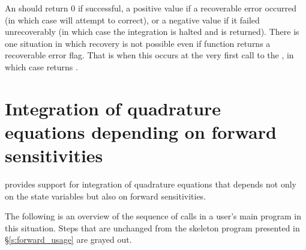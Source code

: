 {
  An  should return 0 if successful, a positive value if a recoverable
  error occurred (in which case {\idas} will attempt to correct), or a negative 
  value if it failed unrecoverably (in which case the integration is halted and
   is returned).
}
{
  There is one situation in which recovery is not possible even if
   function returns a recoverable error flag.  That is
  when this occurs at the very first call to the , in
  which case {\idas} returns .
}

\section{Integration of quadrature equations depending on forward sensitivities}
\label{s:forward_quad_usage}

{\idas} provides support for integration of quadrature equations that depends not only 
on the state variables but also on forward sensitivities.

The following is an overview of the sequence of calls in a user's main program in 
this situation. Steps that are unchanged from the skeleton program presented in 
\S\ref{s:forward_usage} are grayed out.

